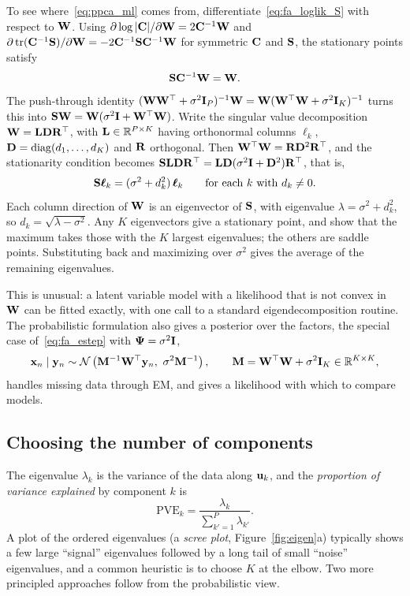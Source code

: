 To see where~\eqref{eq:ppca_ml} comes from, differentiate~\eqref{eq:fa_loglik_S} with respect to $\mathbf{W}$. Using $\partial\log|\mathbf{C}|/\partial\mathbf{W}=2\mathbf{C}^{-1}\mathbf{W}$ and $\partial\operatorname{tr}(\mathbf{C}^{-1}\mathbf{S})/\partial\mathbf{W}=-2\mathbf{C}^{-1}\mathbf{S}\mathbf{C}^{-1}\mathbf{W}$ for symmetric $\mathbf{C}$ and $\mathbf{S}$, the stationary points satisfy
\begin{equation}
  \mathbf{S}\mathbf{C}^{-1}\mathbf{W}=\mathbf{W}.
\end{equation}
The push-through identity $(\mathbf{W}\mathbf{W}^\top+\sigma^2\mathbf{I}_P)^{-1}\mathbf{W}=\mathbf{W}(\mathbf{W}^\top\mathbf{W}+\sigma^2\mathbf{I}_K)^{-1}$ turns this into $\mathbf{S}\mathbf{W}=\mathbf{W}(\sigma^2\mathbf{I}+\mathbf{W}^\top\mathbf{W})$. Write the singular value decomposition $\mathbf{W}=\mathbf{L}\mathbf{D}\mathbf{R}^\top$, with $\mathbf{L}\in\mathbb{R}^{P\times K}$ having orthonormal columns $\boldsymbol{\ell}_k$, $\mathbf{D}=\operatorname{diag}(d_1,\dots,d_K)$ and $\mathbf{R}$ orthogonal. Then $\mathbf{W}^\top\mathbf{W}=\mathbf{R}\mathbf{D}^2\mathbf{R}^\top$, and the stationarity condition becomes $\mathbf{S}\mathbf{L}\mathbf{D}\mathbf{R}^\top=\mathbf{L}\mathbf{D}(\sigma^2\mathbf{I}+\mathbf{D}^2)\mathbf{R}^\top$, that is,
\begin{equation}
  \mathbf{S}\boldsymbol{\ell}_k=(\sigma^2+d_k^2)\,\boldsymbol{\ell}_k \qquad\text{for each }k\text{ with }d_k\neq0.
\end{equation}
Each column direction of $\mathbf{W}$ is an eigenvector of $\mathbf{S}$, with eigenvalue $\lambda=\sigma^2+d_k^2$, so $d_k=\sqrt{\lambda-\sigma^2}$. Any $K$ eigenvectors give a stationary point, and \citet{tipping1999} show that the maximum takes those with the $K$ largest eigenvalues; the others are saddle points. Substituting back and maximizing over $\sigma^2$ gives the average of the remaining eigenvalues.

This is unusual: a latent variable model with a likelihood that is not convex in $\mathbf{W}$ can be fitted exactly, with one call to a standard eigendecomposition routine. The probabilistic formulation also gives a posterior over the factors, the special case of~\eqref{eq:fa_estep} with $\boldsymbol{\Psi}=\sigma^2\mathbf{I}$,
\begin{equation}
  \vx_n\mid\vy_n\sim\Normal\left(\mM^{-1}\mW^\top\vy_n,\ \sigma^2\mM^{-1}\right), \qquad \mM=\mW^\top\mW+\sigma^2\mI_K\in\R^{K\times K},
  \label{eq:ppca_post}
\end{equation}
handles missing data through EM, and gives a likelihood with which to compare models.

\subsection{Choosing the number of components}

The eigenvalue $\lambda_k$ is the variance of the data along $\mathbf{u}_k$, and the \emph{proportion of variance explained} by component $k$ is
\begin{equation}
  \text{PVE}_k=\frac{\lambda_k}{\sum_{k'=1}^P\lambda_{k'}}.
\end{equation}
A plot of the ordered eigenvalues (a \emph{scree plot}, Figure~\ref{fig:eigen}a) typically shows a few large ``signal'' eigenvalues followed by a long tail of small ``noise'' eigenvalues, and a common heuristic is to choose $K$ at the elbow. Two more principled approaches follow from the probabilistic view.

